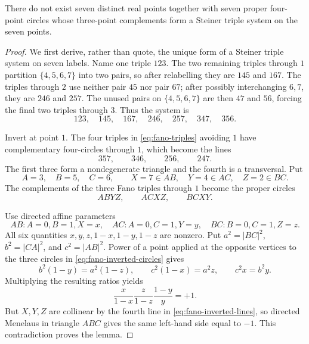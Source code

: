 \begin{lemma}\label{lem:fano-seven-wall}
There do not exist seven distinct real points together with seven proper
four-point circles whose three-point complements form a Steiner triple
system on the seven points.
\end{lemma}

\begin{proof}
We first derive, rather than quote, the unique form of a Steiner triple
system on seven labels.  Name one triple $123$.  The two remaining triples
through $1$ partition $\{4,5,6,7\}$ into two pairs, so after relabelling they
are $145$ and $167$.  The triples through $2$ use neither pair $45$ nor pair
$67$; after possibly interchanging $6,7$, they are $246$ and $257$.  The
unused pairs on $\{4,5,6,7\}$ are then $47$ and $56$, forcing the final two
triples through $3$.  Thus the system is
\begin{equation}\label{eq:fano-triples}
 123,\quad145,\quad167,\quad246,\quad257,\quad347,
 \quad356.
\end{equation}

Invert at point $1$.  The four triples in \eqref{eq:fano-triples} avoiding
$1$ have complementary four-circles through $1$, which become the lines
\begin{equation}\label{eq:fano-inverted-lines}
 357,\qquad346,\qquad256,\qquad247.
\end{equation}
The first three form a nondegenerate triangle and the fourth is a
transversal.  Put
\[
 A=3,\quad B=5,\quad C=6,\qquad
 X=7\in AB,\quad Y=4\in AC,\quad Z=2\in BC.
\]
The complements of the three Fano triples through $1$ become the proper
circles
\begin{equation}\label{eq:fano-inverted-circles}
 ABYZ,\qquad ACXZ,\qquad BCXY.
\end{equation}

Use directed affine parameters
\[
 AB:A=0,B=1,X=x,\quad
 AC:A=0,C=1,Y=y,\quad
 BC:B=0,C=1,Z=z.
\]
All six quantities $x,y,z,1-x,1-y,1-z$ are nonzero.  Put
$a^2=|BC|^2$, $b^2=|CA|^2$, and $c^2=|AB|^2$.  Power of a point applied at
the opposite vertices to the three circles in
\eqref{eq:fano-inverted-circles} gives
\[
 b^2(1-y)=a^2(1-z),\qquad
 c^2(1-x)=a^2z,\qquad
 c^2x=b^2y.
\]
Multiplying the resulting ratios yields
\begin{equation}\label{eq:fano-power-product}
 \frac{x}{1-x}\frac{z}{1-z}\frac{1-y}{y}=+1.
\end{equation}
But $X,Y,Z$ are collinear by the fourth line in
\eqref{eq:fano-inverted-lines}, so directed Menelaus in triangle $ABC$
gives the same left-hand side equal to $-1$.  This contradiction proves the
lemma.
\end{proof}

